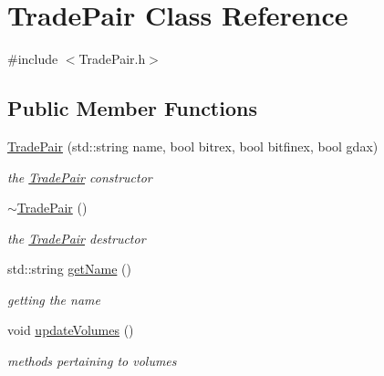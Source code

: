 \hypertarget{class_trade_pair}{}\section{Trade\+Pair Class Reference}
\label{class_trade_pair}


{\ttfamily \#include $<$Trade\+Pair.\+h$>$}

\subsection*{Public Member Functions}
\begin{DoxyCompactItemize}
\item 
\mbox{\label{class_trade_pair_ab1d919b4f029416cc06c302501db9fa1}} 
\mbox{\hyperlink{class_trade_pair_ab1d919b4f029416cc06c302501db9fa1}{Trade\+Pair}} (std\+::string name, bool bitrex, bool bitfinex, bool gdax)
\begin{DoxyCompactList}\small\item\em the \mbox{\hyperlink{class_trade_pair}{Trade\+Pair}} constructor \end{DoxyCompactList}\item 
\mbox{\label{class_trade_pair_a4ae4da33d826b28ec80d5b8d2f8af162}} 
\mbox{\hyperlink{class_trade_pair_a4ae4da33d826b28ec80d5b8d2f8af162}{$\sim$\+Trade\+Pair}} ()
\begin{DoxyCompactList}\small\item\em the \mbox{\hyperlink{class_trade_pair}{Trade\+Pair}} destructor \end{DoxyCompactList}\item 
std\+::string \mbox{\hyperlink{class_trade_pair_a81a10b0d32c7708e537056fe07856981}{get\+Name}} ()
\begin{DoxyCompactList}\small\item\em getting the name \end{DoxyCompactList}\item 
void \mbox{\hyperlink{class_trade_pair_a4f73937b9e6c60317eae5d8733907916}{update\+Volumes}} ()
\begin{DoxyCompactList}\small\item\em methods pertaining to volumes \end{DoxyCompactList}\item 
\mbox{\label{class_trade_pair_ac9f8868c84a2549662b8b2414ea294ed}} 

\end{DoxyCompactItemize}
